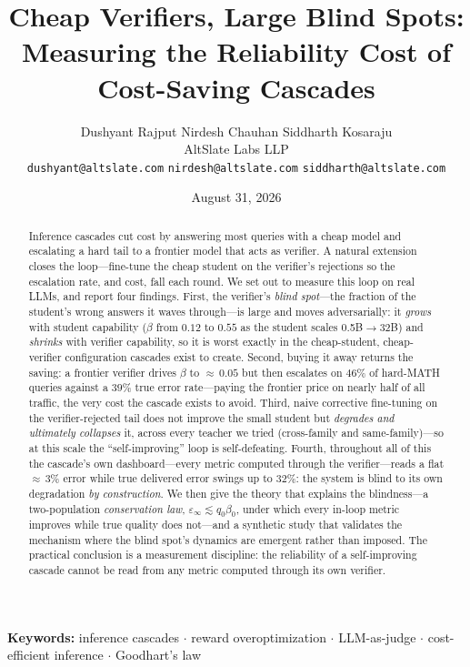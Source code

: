 \documentclass[11pt]{article}
\title{\textbf{Cheap Verifiers, Large Blind Spots:\\[2pt]
Measuring the Reliability Cost of Cost-Saving Cascades}}
\author{Dushyant Rajput \quad Nirdesh Chauhan \quad Siddharth Kosaraju\\[4pt]
{\normalsize AltSlate Labs LLP}\\[2pt]
{\small\texttt{dushyant@altslate.com} \quad \texttt{nirdesh@altslate.com} \quad \texttt{siddharth@altslate.com}}}
\date{August 31, 2026}
\begin{document}
\maketitle

\begin{abstract}
Inference cascades cut cost by answering most queries with a cheap model and
escalating a hard tail to a frontier model that acts as verifier. A natural
extension closes the loop---fine-tune the cheap student on the verifier's
rejections so the escalation rate, and cost, fall each round. We set out to
measure this loop on real LLMs, and report four findings. First, the verifier's
\emph{blind spot}---the fraction of the student's wrong answers it waves
through---is large and moves adversarially: it \emph{grows} with student
capability ($\beta$ from $0.12$ to $0.55$ as the student scales 0.5B$\to$32B) and
\emph{shrinks} with verifier capability, so it is worst exactly in the
cheap-student, cheap-verifier configuration cascades exist to create. Second,
buying it away returns the saving: a frontier verifier drives $\beta$ to
${\approx}\,0.05$ but then escalates on $46\%$ of hard-MATH queries against a
$39\%$ true error rate---paying the frontier price on nearly half of all traffic,
the very cost the cascade exists to avoid. Third, naive corrective fine-tuning on
the verifier-rejected tail does not improve the small student but \emph{degrades
and ultimately collapses} it, across every teacher we tried (cross-family and
same-family)---so at this scale the ``self-improving'' loop is self-defeating.
Fourth, throughout all of this the cascade's own dashboard---every metric computed
through the verifier---reads a flat ${\approx}\,3\%$ error while true delivered
error swings up to $32\%$: the system is blind to its own degradation \emph{by
construction}. We then give the theory that explains the blindness---a
two-population \emph{conservation law}, $\varepsilon_\infty \lesssim q_0\beta_0$,
under which every in-loop metric improves while true quality does not---and a
synthetic study that validates the mechanism where the blind spot's dynamics are
emergent rather than imposed. The practical conclusion is a measurement
discipline: the reliability of a self-improving cascade cannot be read from any
metric computed through its own verifier.
\end{abstract}

\noindent\textbf{Keywords:} inference cascades $\cdot$ reward overoptimization
$\cdot$ LLM-as-judge $\cdot$ cost-efficient inference $\cdot$ Goodhart's law
\vspace{1em}
\end{document}
